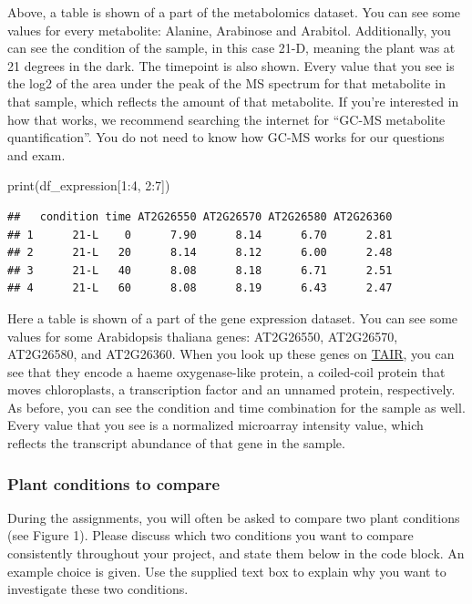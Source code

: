 \documentclass[
]{article}
\newenvironment{Shaded}{\begin{snugshade}}{\end{snugshade}}
\newcommand{\DecValTok}[1]{\textcolor[rgb]{0.00,0.00,0.81}{#1}}
\newcommand{\FunctionTok}[1]{\textcolor[rgb]{0.00,0.00,0.00}{#1}}
\newcommand{\NormalTok}[1]{#1}
\newcommand{\SpecialCharTok}[1]{\textcolor[rgb]{0.00,0.00,0.00}{#1}}
\begin{document}
Above, a table is shown of a part of the metabolomics dataset. You can
see some values for every metabolite: Alanine, Arabinose and Arabitol.
Additionally, you can see the condition of the sample, in this case
21-D, meaning the plant was at 21 degrees in the dark. The timepoint is
also shown. Every value that you see is the log2 of the area under the
peak of the MS spectrum for that metabolite in that sample, which
reflects the amount of that metabolite. If you're interested in how that
works, we recommend searching the internet for ``GC-MS metabolite
quantification''. You do not need to know how GC-MS works for our
questions and exam.

\begin{Shaded}
\begin{Highlighting}[]
\FunctionTok{print}\NormalTok{(df\_expression[}\DecValTok{1}\SpecialCharTok{:}\DecValTok{4}\NormalTok{, }\DecValTok{2}\SpecialCharTok{:}\DecValTok{7}\NormalTok{])}
\end{Highlighting}
\end{Shaded}

\begin{verbatim}
##   condition time AT2G26550 AT2G26570 AT2G26580 AT2G26360
## 1      21-L    0      7.90      8.14      6.70      2.81
## 2      21-L   20      8.14      8.12      6.00      2.48
## 3      21-L   40      8.08      8.18      6.71      2.51
## 4      21-L   60      8.08      8.19      6.43      2.47
\end{verbatim}

Here a table is shown of a part of the gene expression dataset. You can
see some values for some Arabidopsis thaliana genes: AT2G26550,
AT2G26570, AT2G26580, and AT2G26360. When you look up these genes on
\href{https://www.arabidopsis.org/index.jsp}{TAIR}, you can see that
they encode a haeme oxygenase-like protein, a coiled-coil protein that
moves chloroplasts, a transcription factor and an unnamed protein,
respectively. As before, you can see the condition and time combination
for the sample as well. Every value that you see is a normalized
microarray intensity value, which reflects the transcript abundance of
that gene in the sample.

\hypertarget{plant-conditions-to-compare}{%
\subsubsection{Plant conditions to
compare}\label{plant-conditions-to-compare}}

During the assignments, you will often be asked to compare two plant
conditions (see Figure 1). Please discuss which two conditions you want
to compare consistently throughout your project, and state them below in
the code block. An example choice is given. Use the supplied text box to
explain why you want to investigate these two conditions.
\end{document}
